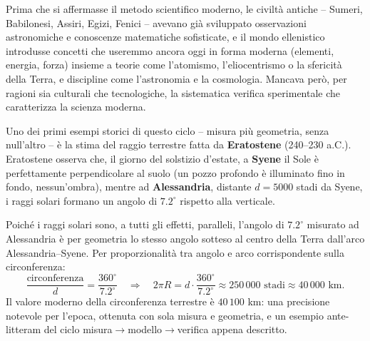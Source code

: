 \documentclass[a4paper,11pt]{article}
\begin{document}
Prima che si affermasse il metodo scientifico moderno, le civiltà antiche -- Sumeri, Babilonesi, Assiri, Egizi, Fenici -- avevano già sviluppato osservazioni astronomiche e conoscenze matematiche sofisticate, e il mondo ellenistico introdusse concetti che useremmo ancora oggi in forma moderna (elementi, energia, forza) insieme a teorie come l'atomismo, l'eliocentrismo o la sfericità della Terra, e discipline come l'astronomia e la cosmologia. Mancava però, per ragioni sia culturali che tecnologiche, la sistematica verifica sperimentale che caratterizza la scienza moderna.

Uno dei primi esempi storici di questo ciclo -- misura più geometria, senza null'altro -- è la stima del raggio terrestre fatta da \textbf{Eratostene} (240--230 a.C.). Eratostene osserva che, il giorno del solstizio d'estate, a \textbf{Syene} il Sole è perfettamente perpendicolare al suolo (un pozzo profondo è illuminato fino in fondo, nessun'ombra), mentre ad \textbf{Alessandria}, distante $d=5000$ stadi da Syene, i raggi solari formano un angolo di $7.2^{\circ}$ rispetto alla verticale.

\begin{center}
\end{center}

Poiché i raggi solari sono, a tutti gli effetti, paralleli, l'angolo di $7.2^{\circ}$ misurato ad Alessandria è per geometria lo stesso angolo sotteso al centro della Terra dall'arco Alessandria--Syene. Per proporzionalità tra angolo e arco corrispondente sulla circonferenza:
\[
\frac{\text{circonferenza}}{d} = \frac{360^{\circ}}{7.2^{\circ}} \quad\Rightarrow\quad 2\pi R = d \cdot \frac{360^{\circ}}{7.2^{\circ}} \approx 250\,000 \text{ stadi} \approx 40\,000 \text{ km}.
\]
Il valore moderno della circonferenza terrestre è $40\,100$ km: una precisione notevole per l'epoca, ottenuta con sola misura e geometria, e un esempio ante-litteram del ciclo misura$\to$modello$\to$verifica appena descritto.
\end{document}
